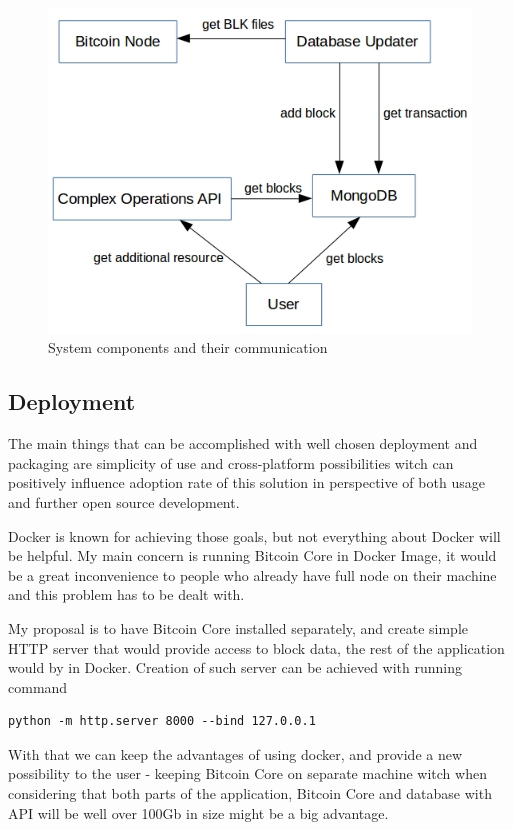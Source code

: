 \documentclass[12pt, en, eng]{mgr}
\begin{document}
\begin{figure}[H]
  \includegraphics[width=0.8\linewidth]{component-diagram.png}
  \caption{System components and their communication}
  \label{fig:system-components-and-their-communication}
\end{figure}



\subsection{Deployment}

The main things that can be accomplished with well chosen deployment and packaging are simplicity of use and cross-platform possibilities witch can positively influence adoption rate of this solution in perspective of both usage and further open source development.

Docker is known for achieving those goals, but not everything about Docker will be helpful. My main concern is running Bitcoin Core in Docker Image, it would be a great inconvenience to people who already have full node on their machine and this problem has to be dealt with.

My proposal is to have Bitcoin Core installed separately, and create simple HTTP server that would provide access to block data, the rest of the application would by in Docker. Creation of such server can be achieved with running command  
\begin{verbatim}
python -m http.server 8000 --bind 127.0.0.1
\end{verbatim}
With that we can keep the advantages of using docker, and provide a new possibility to the user - keeping Bitcoin Core on separate machine witch when considering that both parts of the application, Bitcoin Core and database with API will be well over 100Gb in size might be a big advantage.
\end{document}
